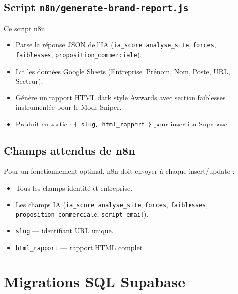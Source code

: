 \documentclass[11pt,a4paper]{report}
\begin{document}
\section{Script \texttt{n8n/generate-brand-report.js}}

Ce script n8n :
\begin{itemize}[leftmargin=*]
  \item Parse la réponse JSON de l'IA (\texttt{ia\_score}, \texttt{analyse\_site}, \texttt{forces}, \texttt{faiblesses}, \texttt{proposition\_commerciale}).
  \item Lit les données Google Sheets (Entreprise, Prénom, Nom, Poste, URL, Secteur).
  \item Génère un rapport HTML dark style Awwards avec section faiblesses instrumentée pour le Mode Sniper.
  \item Produit en sortie : \texttt{\{ slug, html\_rapport \}} pour insertion Supabase.
\end{itemize}

\section{Champs attendus de n8n}

Pour un fonctionnement optimal, n8n doit envoyer à chaque insert/update :
\begin{itemize}[leftmargin=*]
  \item Tous les champs identité et entreprise.
  \item Les champs IA (\texttt{ia\_score}, \texttt{analyse\_site}, \texttt{forces}, \texttt{faiblesses}, \texttt{proposition\_commerciale}, \texttt{script\_email}).
  \item \texttt{slug} --- identifiant URL unique.
  \item \texttt{html\_rapport} --- rapport HTML complet.
\end{itemize}

\chapter{Migrations SQL Supabase}
\end{document}
